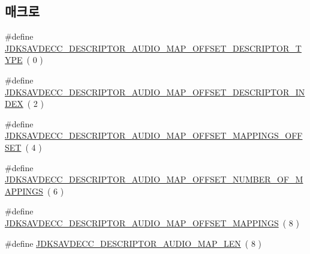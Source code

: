 \subsection*{매크로}
\begin{DoxyCompactItemize}
\item 
\#define \hyperlink{group__descriptor__audio__map_gaaebd07706c6f00e0216d355ae2081e6d}{J\+D\+K\+S\+A\+V\+D\+E\+C\+C\+\_\+\+D\+E\+S\+C\+R\+I\+P\+T\+O\+R\+\_\+\+A\+U\+D\+I\+O\+\_\+\+M\+A\+P\+\_\+\+O\+F\+F\+S\+E\+T\+\_\+\+D\+E\+S\+C\+R\+I\+P\+T\+O\+R\+\_\+\+T\+Y\+PE}~( 0 )
\item 
\#define \hyperlink{group__descriptor__audio__map_ga59489041fea75ac82ceebf16d1c54f1c}{J\+D\+K\+S\+A\+V\+D\+E\+C\+C\+\_\+\+D\+E\+S\+C\+R\+I\+P\+T\+O\+R\+\_\+\+A\+U\+D\+I\+O\+\_\+\+M\+A\+P\+\_\+\+O\+F\+F\+S\+E\+T\+\_\+\+D\+E\+S\+C\+R\+I\+P\+T\+O\+R\+\_\+\+I\+N\+D\+EX}~( 2 )
\item 
\#define \hyperlink{group__descriptor__audio__map_ga5ed6dd41ba78da1b1c072992ff19871e}{J\+D\+K\+S\+A\+V\+D\+E\+C\+C\+\_\+\+D\+E\+S\+C\+R\+I\+P\+T\+O\+R\+\_\+\+A\+U\+D\+I\+O\+\_\+\+M\+A\+P\+\_\+\+O\+F\+F\+S\+E\+T\+\_\+\+M\+A\+P\+P\+I\+N\+G\+S\+\_\+\+O\+F\+F\+S\+ET}~( 4 )
\item 
\#define \hyperlink{group__descriptor__audio__map_ga785a2bd99b590227ee54f52ef80756d3}{J\+D\+K\+S\+A\+V\+D\+E\+C\+C\+\_\+\+D\+E\+S\+C\+R\+I\+P\+T\+O\+R\+\_\+\+A\+U\+D\+I\+O\+\_\+\+M\+A\+P\+\_\+\+O\+F\+F\+S\+E\+T\+\_\+\+N\+U\+M\+B\+E\+R\+\_\+\+O\+F\+\_\+\+M\+A\+P\+P\+I\+N\+GS}~( 6 )
\item 
\#define \hyperlink{group__descriptor__audio__map_ga0eca80155208645a6c6488dd832076a1}{J\+D\+K\+S\+A\+V\+D\+E\+C\+C\+\_\+\+D\+E\+S\+C\+R\+I\+P\+T\+O\+R\+\_\+\+A\+U\+D\+I\+O\+\_\+\+M\+A\+P\+\_\+\+O\+F\+F\+S\+E\+T\+\_\+\+M\+A\+P\+P\+I\+N\+GS}~( 8 )
\item 
\#define \hyperlink{group__descriptor__audio__map_gaf25e1ca640ec4fced1a131446d24dd9f}{J\+D\+K\+S\+A\+V\+D\+E\+C\+C\+\_\+\+D\+E\+S\+C\+R\+I\+P\+T\+O\+R\+\_\+\+A\+U\+D\+I\+O\+\_\+\+M\+A\+P\+\_\+\+L\+EN}~( 8 )
\end{DoxyCompactItemize}
